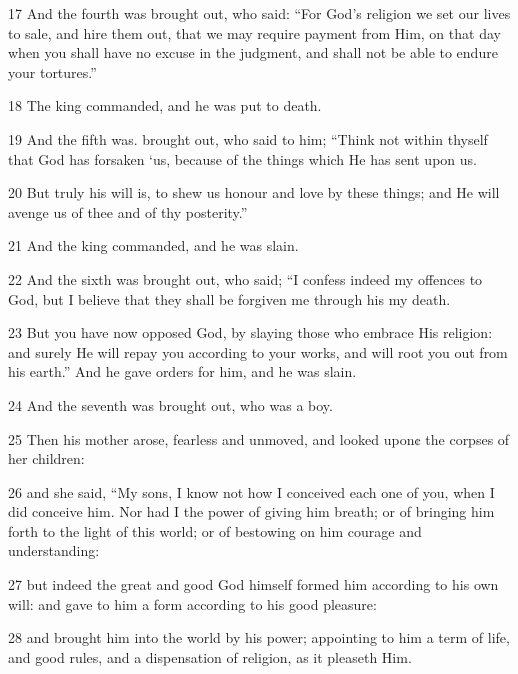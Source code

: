 \par 17 And the fourth was brought out, who said: “For God’s religion we set our lives to sale, and hire them out, that we may require payment from Him, on that day when you shall have no excuse in the judgment, and shall not be able to endure your tortures.” 

\par 18 The king commanded, and he was put to death. 

\par 19 And the fifth was. brought out, who said to him; “Think not within thyself that God has forsaken ‘us, because of the things which He has sent upon us. 

\par 20 But truly his will is, to shew us honour and love by these things; and He will avenge us of thee and of thy posterity.” 

\par 21 And the king commanded, and he was slain. 

\par 22 And the sixth was brought out, who said; “I confess indeed my offences to God, but I believe that they shall be forgiven me through his my death. 

\par 23 But you have now opposed God, by slaying those who embrace His religion: and surely He will repay you according to your works, and will root you out from his earth.” And he gave orders for him, and he was slain. 

\par 24 And the seventh was brought out, who was a boy. 

\par 25 Then his mother arose, fearless and unmoved, and looked upon¢ the corpses of her children: 

\par 26 and she said, “My sons, I know not how I conceived each one of you, when I did conceive him. Nor had I the power of giving him breath; or of bringing him forth to the light of this world; or of bestowing on him courage and understanding: 

\par 27 but indeed the great and good God himself formed him according to his own will: and gave to him a form according to his good pleasure: 

\par 28 and brought him into the world by his power; appointing to him a term of life, and good rules, and a dispensation of religion, as it pleaseth Him. 

